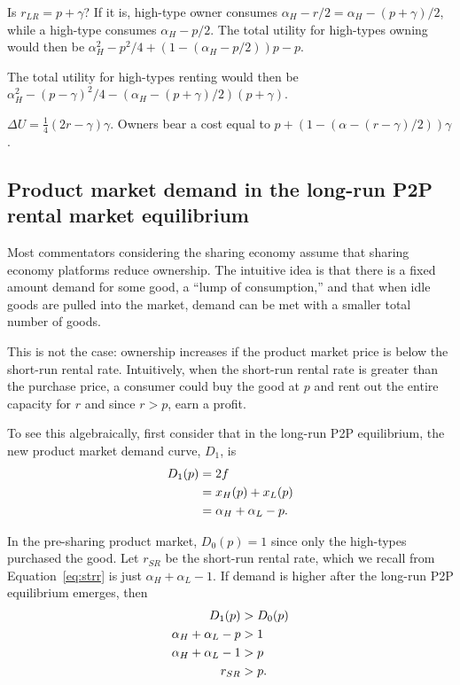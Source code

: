 \documentclass[11pt]{article}
\begin{document}
Is $r_{LR} = p + \gamma$?
If it is, high-type owner consumes $\alpha_H - r/2 = \alpha_H - (p + \gamma)/2$, while a high-type consumes $\alpha_H - p/2$. 
The total utility for high-types owning would then be $\alpha_H^2 - p^2/4 + (1 - (\alpha_H - p/2))p - p$.

The total utility for high-types renting would then be $\alpha_H^2 - (p - \gamma)^2/4 - (\alpha_H - (p + \gamma)/2)(p + \gamma)$.

$\Delta U = \frac{1}{4}(2r - \gamma)\gamma$.
Owners bear a cost equal to $p + (1 - (\alpha - (r - \gamma)/2))\gamma$. 


\subsection{Product market demand in the long-run P2P rental market equilibrium} 
Most commentators considering the sharing economy assume that sharing economy platforms reduce ownership. 
The intuitive idea is that there is a fixed amount demand for some good, a ``lump of consumption,'' and that when idle goods are pulled into the market, demand can be met with a smaller total number of goods.

This is not the case:  
ownership increases if the product market price is below the short-run rental rate.
Intuitively, when the short-run rental rate is greater than the purchase price, a consumer could buy the good at $p$ and rent out the entire capacity for $r$ and since $r > p$, earn a profit. 

To see this algebraically, first consider that in the long-run P2P equilibrium, the new product market demand curve, $D_1$, is
\begin{align}
D_1(p) &= 2f \notag \\  
     &= x_H(p) + x_L(p) \notag \\ 
     &= \alpha_H + \alpha_L - p.  
\end{align} 

In the pre-sharing product market, $D_0(p) = 1$ since only the high-types purchased the good. 
Let $r_{SR}$ be the short-run rental rate, which we recall from Equation~\ref{eq:strr} is just $\alpha_H + \alpha_L - 1$. 
If demand is higher after the long-run P2P equilibrium emerges, then  
\begin{align} 
D_{1}(p) & > D_{0}(p) \notag \\
\alpha_H + \alpha_L - p &> 1 \notag \\ 
\alpha_H + \alpha_L - 1 &> p \notag \\ 
r_{SR} &>  p. 
\end{align} 
\end{document}
